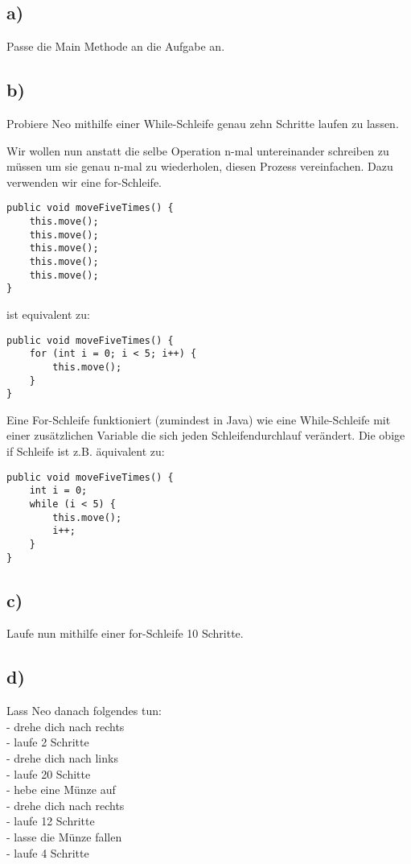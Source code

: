 \subsection*{a)}
	Passe die Main Methode an die Aufgabe an.
\subsection*{b)}

	Probiere Neo mithilfe einer While-Schleife genau zehn Schritte laufen zu lassen.

\begin{Infobox}
		Wir wollen nun anstatt die selbe Operation n-mal untereinander schreiben zu müssen um sie genau n-mal zu wiederholen, diesen Prozess vereinfachen.
		Dazu verwenden wir eine for-Schleife. 
		\begin{lstlisting}
public void moveFiveTimes() {
	this.move();
	this.move();
	this.move();
	this.move();
	this.move();
}
		\end{lstlisting}
		ist equivalent zu:
		\begin{lstlisting}
public void moveFiveTimes() {
	for (int i = 0; i < 5; i++) {
		this.move();
	}
}
		\end{lstlisting}
Eine For-Schleife funktioniert (zumindest in Java) wie eine While-Schleife mit einer zusätzlichen Variable die sich jeden Schleifendurchlauf verändert.
Die obige if Schleife ist z.B. äquivalent zu:
		\begin{lstlisting}
public void moveFiveTimes() {
	int i = 0;
	while (i < 5) {
		this.move();
		i++;
	}
}
		\end{lstlisting}
 \end{Infobox}

\subsection*{c)}
Laufe nun mithilfe einer for-Schleife 10 Schritte.

\subsection*{d)}
Lass Neo danach folgendes tun:\\
	- drehe dich nach rechts\\
	- laufe 2 Schritte\\
	- drehe dich nach links\\ 
	- laufe 20 Schitte\\
	- hebe eine Münze auf\\
	- drehe dich nach rechts\\
	- laufe 12 Schritte\\
	- lasse die Münze fallen\\
	- laufe 4 Schritte

